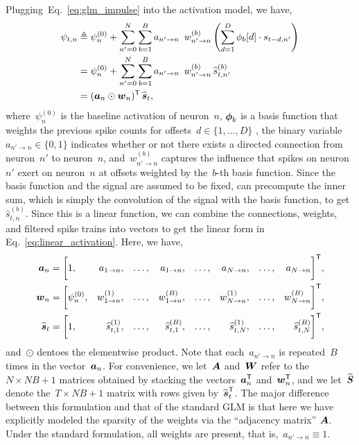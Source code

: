 Plugging~Eq.~\ref{eq:glm_impulse} into the activation model, we have,
\begin{align}
  \nonumber
  \psi_{t,n} &\triangleq \psi_n^{(0)}  +                 
               \sum_{n'=0}^N  \sum_{b=1}^B a_{n' \to n} \, w_{n' \to n}^{(b)}
               \left( \sum_{d=1}^{D} \phi_{b}[d] \cdot s_{t-d, n'} \right) \\
  \nonumber
             &= \psi_n^{(0)}  + \sum_{n'=0}^N \sum_{b=1}^B a_{n' \to n} \, w_{n' \to n}^{(b)} \, \widehat{s}_{t,n'}^{(b)} \\
  \label{eq:linear_activation}
             &= (\ba_{n} \odot \bw_n)^\trans \, \widehat{\bs}_t,
\end{align}
where~$\psi_n^{(0)}$ is the baseline activation of neuron~$n$,
$\boldsymbol{\phi}_{b}$ is a basis function 
that weights the previous spike counts for 
offsets~${d \in \{1, \ldots, D\}}$
, the binary variable~${a_{n' \to n} \in \{0,1\}}$ 
indicates whether or not there exists 
a directed connection from neuron~$n'$ to neuron~$n$,
and~$w_{n' \to n}^{(b)}$ captures the influence that
spikes on neuron~$n'$ exert on neuron~$n$ at
offsets weighted by the~$b$-th basis function.  
Since the basis function and the signal 
are assumed to be fixed,  can precompute the inner sum, which is simply the 
convolution of the signal with the basis function, to get~$\widehat{s}_{t,n}^{(b)}$.
Since this is a linear function, we can combine the
connections, weights, and filtered spike trains into
vectors to get the linear form  in Eq.~\ref{eq:linear_activation}.
Here, we have,
\begin{align*}
  \boldsymbol{a}_n &=
    \bigg[
      1,  
      & a_{1 \to n}, & & \ldots, & & a_{1 \to n}, 
      & & \ldots, &
      &a_{N \to n}, & & \ldots, & &a_{N \to n} 
    &\bigg]^{\mathsf{T}}, \\
  \boldsymbol{w}_n &=
    \bigg[
      \psi_n^{(0)}, 
      &w_{1 \to n}^{(1)}, & & \ldots, & &w_{1 \to n}^{(B)}, 
      & &\ldots, &
      &w_{N \to n}^{(1)}, & & \ldots, & &w_{N \to n}^{(B)} 
      &\bigg]^{\mathsf{T}}, \\
  \widehat{\boldsymbol{s}}_t &=
    \bigg[
      1, 
      &\widehat{s}_{t,1}^{(1)}, & & \ldots, & &\widehat{s}_{t,1}^{(B)}, 
      & &\ldots, &
      &\widehat{s}_{t,N}^{(1)}, & & \ldots, & &\widehat{s}_{t,N}^{(B)} 
    &\bigg]^{\mathsf{T}},
\end{align*}
\sloppy
and~$\odot$ dentoes the elementwise product. Note that each~$a_{n' \to n}$ 
is repeated~$B$ times in the vector~$\boldsymbol{a}_{n}$. For convenience, we
let~$\boldsymbol{A}$ and~$\boldsymbol{W}$ refer to the~${N \times NB+1}$ matrices obtained
by stacking the vectors~$\boldsymbol{a}_n^{\mathsf{T}}$ and~$\boldsymbol{w}_n^{\mathsf{T}}$, and we
let~$\widehat{\boldsymbol{S}}$ denote the~${T \times NB+1}$ matrix with rows
given by~$\widehat{\boldsymbol{s}}_t^{\mathsf{T}}$. The major difference between this formulation and that of the standard 
GLM is that here we have explicitly modeled the sparsity of the 
weights via the ``adjacency matrix'' $\boldsymbol{A}$. Under the standard 
formulation, all weights are present, that is,~${a_{n' \to n} \equiv 1}$.

